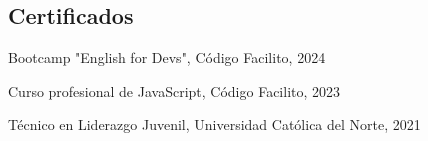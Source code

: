 \begin{CVsidebar}
    \LngTextILR
    
    
    
    \dotline
    
    
    
    \section{Certificados}
    \begin{itemlist}
        \item Bootcamp "English for Devs", Código Facilito, 2024
        \item Curso profesional de JavaScript, Código Facilito, 2023
        \item Técnico en Liderazgo Juvenil, Universidad Católica del Norte, 2021
    \end{itemlist}
    
    
    
    
    
    
    \end{CVsidebar}